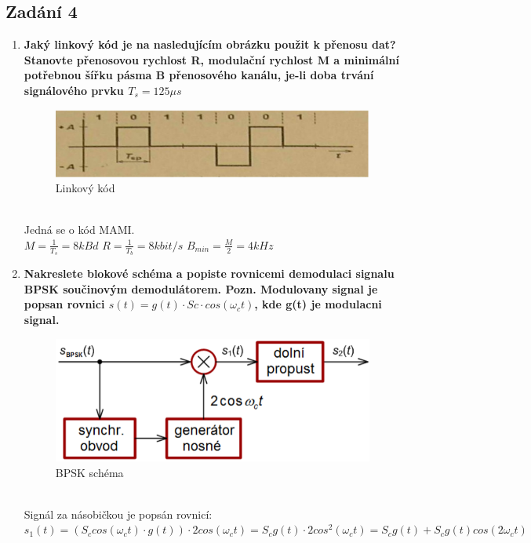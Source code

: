 \subsection{Zadání 4}
\begin{enumerate}
    \item \textbf{Jaký linkový kód je na nasledujícím obrázku použit k přenosu dat? Stanovte přenosovou
    rychlost R, modulační rychlost M a minimální potřebnou šířku pásma B přenosového
    kanálu, je-li doba trvání signálového prvku \(T_s = 125\mu s\)}\\
    \begin{figure}[h]
        \centering
        \includegraphics[scale = 0.3]{images/MAMI.png}
        \caption{Linkový kód}
    \end{figure}\\
    Jedná se o kód MAMI.\\
    \(M = \frac{1}{T_s} = 8kBd\) \(R = \frac{1}{T_b} = 8kbit/s\) \(B_{min} = \frac{M}{2} = 4kHz\)
    \item \textbf{Nakreslete blokové schéma a popiste rovnicemi demodulaci signalu BPSK součinovým
    demodulátorem. Pozn. Modulovany signal je popsan rovnici \(s(t)=g(t)\cdot Sc\cdot cos(\omega_c t)\), kde
    g(t) je modulacni signal.}\\
    \begin{figure}[h]
        \centering
        \includegraphics[scale = 0.5]{images/BPSKSchema.png}
        \caption{BPSK schéma}
    \end{figure}\\
    Signál za násobičkou je popsán rovnicí: \(s_1(t) = (S_ccos(\omega_c t)\cdot g(t))\cdot 2cos(\omega_c t) = S_cg(t)\cdot 2cos^2(\omega_c t) = S_cg(t)+S_cg(t)cos(2\omega_ct)\)\\

\end{enumerate}
